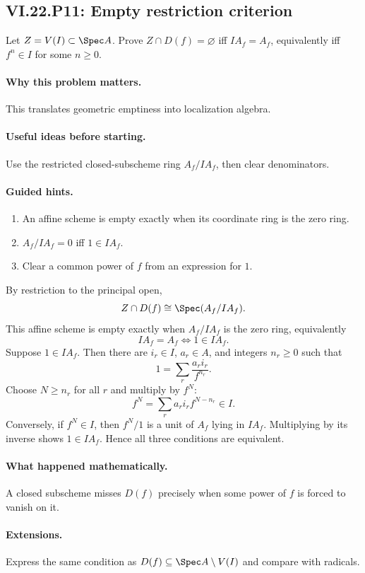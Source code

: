 \subsection*{VI.22.P11: Empty restriction criterion}
\begin{problem}\label{prob:vi22-p11}
Let $Z=V(I)\subset\Spec A$.  Prove $Z\cap D(f)=\varnothing$ iff $IA_f=A_f$, equivalently iff $f^n\in I$ for some $n\ge0$.
\end{problem}

\ifdefined\FullProblemDossiers
\paragraph{Why this problem matters.}
This translates geometric emptiness into localization algebra.

\paragraph{Useful ideas before starting.}
Use the restricted closed-subscheme ring $A_f/IA_f$, then clear denominators.

\paragraph{Guided hints.}
\begin{enumerate}
\item An affine scheme is empty exactly when its coordinate ring is the zero ring.
\item $A_f/IA_f=0$ iff $1\in IA_f$.
\item Clear a common power of $f$ from an expression for $1$.
\end{enumerate}

\begin{solution}
By restriction to the principal open,
\[
 Z\cap D(f)\cong\Spec(A_f/IA_f).
\]
This affine scheme is empty exactly when $A_f/IA_f$ is the zero ring, equivalently
\[
 IA_f=A_f
 \iff 1\in IA_f.
\]
Suppose $1\in IA_f$.  Then there are $i_r\in I$, $a_r\in A$, and integers $n_r\ge0$ such
that
\[
 1=\sum_r \frac{a_r i_r}{f^{n_r}}.
\]
Choose $N\ge n_r$ for all $r$ and multiply by $f^N$:
\[
 f^N=\sum_r a_r i_r f^{N-n_r}\in I.
\]
Conversely, if $f^N\in I$, then $f^N/1$ is a unit of $A_f$ lying in $IA_f$.  Multiplying by
its inverse shows $1\in IA_f$.  Hence all three conditions are equivalent.
\end{solution}

\paragraph{What happened mathematically.}
A closed subscheme misses $D(f)$ precisely when some power of $f$ is forced to vanish on it.

\paragraph{Extensions.}
Express the same condition as $D(f)\subseteq\Spec A\setminus V(I)$ and compare with radicals.
\fi
